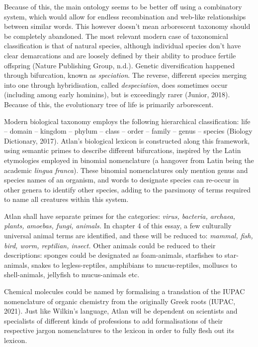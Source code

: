 Because of this, the main ontology seems to be better off using a combinatory system, which would allow for endless recombination and web-like relationships between similar words. This however doesn’t mean arborescent taxonomy should be completely abandoned. The most relevant modern case of taxonomical classification is that of natural species, although individual species don’t have clear demarcations and are loosely defined by their ability to produce fertile offspring (Nature Publishing Group, n.d.). Genetic diversification happened through bifurcation, known as {\it speciation}. The reverse, different species merging into one through hybridisation, called {\it despeciation}, does sometimes occur (including among early hominins), but is exceedingly rarer (Junior, 2018). Because of this, the evolutionary tree of life is primarily arborescent. 

Modern biological taxonomy employs the following hierarchical classification: life – domain – kingdom – phylum – class – order – family – genus – species (Biology Dictionary, 2017). Atlan’s biological lexicon is constructed along this framework, using semantic primes to describe different bifurcations, inspired by the Latin etymologies employed in binomial nomenclature (a hangover from Latin being the academic {\it lingua franca}). These binomial nomenclatures only mention genus and species names of an organism, and words to designate species can re-occur in other genera to identify other species, adding to the parsimony of terms required to name all creatures within this system. 

Atlan shall have separate primes for the categories: \textit{virus, bacteria, archaea, plants, amoebas, fungi, animals.} In chapter 4 of this essay, a few culturally universal animal terms are identified, and these will be reduced to: \textit{mammal, fish, bird, worm, reptilian, insect.} Other animals could be reduced to their descriptions: sponges could be designated as foam-animals, starfishes to star-animals, snakes to legless-reptiles, amphibians to mucus-reptiles, molluscs to shell-animals, jellyfish to mucus-animals etc.  


Chemical molecules could be named by formalising a translation of the IUPAC nomenclature of organic chemistry from the originally Greek roots (IUPAC, 2021). Just like Wilkin’s language, Atlan will be dependent on scientists and specialists of different kinds of professions to add formalisations of their respective jargon nomenclatures to the lexicon in order to fully flesh out its lexicon. 

